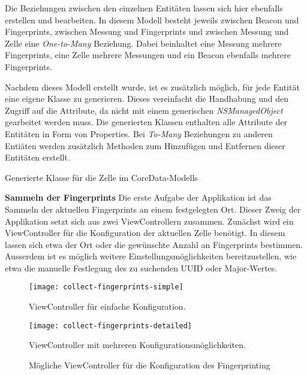 Die Beziehungen zwischen den einzelnen Entitäten lassen sich hier ebenfalls erstellen und bearbeiten. In diesem Modell besteht jeweils zwischen Beacon und Fingerprints, zwischen Messung und Fingerprints und zwischen Messung und Zelle eine \emph{One-to-Many} Beziehung. Dabei beinhaltet eine Messung mehrere Fingerprints, eine Zelle mehrere Messungen und ein Beacon ebenfalls mehrere Fingerprints.

Nachdem dieses Modell erstellt wurde, ist es zusätzlich möglich, für jede Entität eine eigene Klasse zu generieren. Dieses vereinfacht die Handhabung und den Zugriff auf die Attribute, da nicht mit einem generischen \emph{NSManagedObject} gearbeitet werden muss. Die generierten Klassen enthalten alle Attribute der Entitäten in Form von Properties. Bei \emph{To-Many} Beziehungen zu anderen Entiäten werden zusätzlich Methoden zum Hinzufügen und Entfernen dieser Entitäten erstellt.

\begin{listing}[htb!]
	\caption{Generierte Klasse für die Zelle im CoreData-Modells}
	\label{lst:cell_objc}
\end{listing}
  

\textbf{Sammeln der Fingerprints}
Die erste Aufgabe der Applikation ist das Sammeln der aktuellen Fingerprints an einem festgelegten Ort. Dieser Zweig der Applikation setzt sich aus zwei ViewControllern zusammen. Zunächst wird ein ViewController für die Konfiguration der aktuellen Zelle benötigt. In diesem lassen sich etwa der Ort oder die gewünschte Anzahl an Fingerprints bestimmen. Ausserdem ist es möglich weitere Einstellungsmöglichkeiten bereitzustellen, wie etwa die manuelle Festlegung des zu suchenden UUID oder Major-Wertes. 

\begin{figure}[h!]
	\centering
	\begin{minipage}[t]{5cm}
		\texttt{[image: collect-fingerprints-simple]}
		\caption{ViewController für einfache Konfiguration.}
		\label{collect-fingerprints-simple}
	\end{minipage}
	\hspace{2cm}
	\begin{minipage}[t]{5cm}
			\texttt{[image: collect-fingerprints-detailed]}
			\caption{ViewController mit mehreren Konfigurationsmöglichkeiten.}
			\label{collect-fingerprints-detailed}
	\end{minipage}
		\caption{Mögliche ViewController für die Konfiguration des Fingerprinting}
		\label{collect-fingerprints}
\end{figure}

